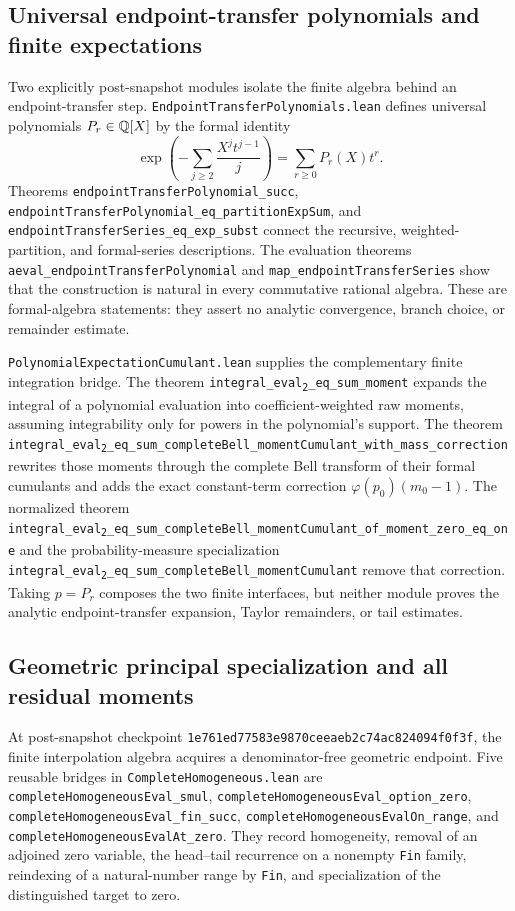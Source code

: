 \documentclass[11pt,oneside]{article}
\theoremstyle{definition}
\theoremstyle{remark}
\newcommand{\leanevaltwo}[1]{%
  \nolinkurl{integral_eval}\texttt{\textsubscript{2}}\nolinkurl{#1}}
\begin{document}
\subsection{Universal endpoint-transfer polynomials and finite expectations}
Two explicitly post-snapshot modules isolate the finite algebra behind an
endpoint-transfer step.  \nolinkurl{EndpointTransferPolynomials.lean} defines
universal polynomials \(P_r\in\mathbb{Q}[X]\) by the formal identity
\[
  \exp\!\left(-\sum_{j\geq2}\frac{X^j t^{j-1}}{j}\right)
  =\sum_{r\geq0}P_r(X)t^r.
\]
Theorems \nolinkurl{endpointTransferPolynomial_succ},
\nolinkurl{endpointTransferPolynomial_eq_partitionExpSum}, and
\nolinkurl{endpointTransferSeries_eq_exp_subst} connect the recursive,
weighted-partition, and formal-series descriptions.  The evaluation theorems
\nolinkurl{aeval_endpointTransferPolynomial} and
\nolinkurl{map_endpointTransferSeries} show that the construction is natural
in every commutative rational algebra.  These are formal-algebra statements:
they assert no analytic convergence, branch choice, or remainder estimate.

\nolinkurl{PolynomialExpectationCumulant.lean} supplies the complementary
finite integration bridge.  The theorem
\leanevaltwo{_eq_sum_moment} expands the integral of a polynomial
evaluation into coefficient-weighted raw moments, assuming integrability only
for powers in the polynomial's support.  The theorem
\leanevaltwo{_eq_sum_completeBell_momentCumulant_with_mass_correction}
rewrites those moments through the complete Bell transform of their formal
cumulants and adds the exact constant-term correction
\(\varphi(p_0)(m_0-1)\).  The normalized theorem
\leanevaltwo{_eq_sum_completeBell_momentCumulant_of_moment_zero_eq_one}
and the probability-measure specialization
\leanevaltwo{_eq_sum_completeBell_momentCumulant} remove that
correction.  Taking \(p=P_r\) composes the two finite interfaces, but neither
module proves the analytic endpoint-transfer expansion, Taylor remainders, or
tail estimates.

\subsection{Geometric principal specialization and all residual moments}
At post-snapshot checkpoint
\nolinkurl{1e761ed77583e9870ceeaeb2c74ac824094f0f3f}, the finite interpolation
algebra acquires a denominator-free geometric endpoint.  Five reusable
bridges in \nolinkurl{CompleteHomogeneous.lean} are
\nolinkurl{completeHomogeneousEval_smul},
\nolinkurl{completeHomogeneousEval_option_zero},
\nolinkurl{completeHomogeneousEval_fin_succ},
\nolinkurl{completeHomogeneousEvalOn_range}, and
\nolinkurl{completeHomogeneousEvalAt_zero}.  They record homogeneity, removal
of an adjoined zero variable, the head--tail recurrence on a nonempty
\texttt{Fin} family, reindexing of a natural-number range by \texttt{Fin}, and
specialization of the distinguished target to zero.
\end{document}
